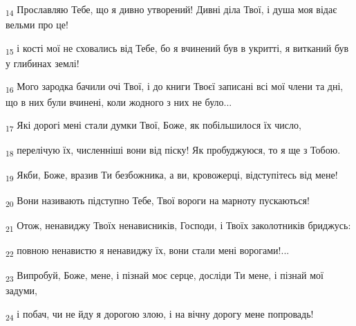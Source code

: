 \begin{tcolorbox}
\textsubscript{14} Прославляю Тебе, що я дивно утворений! Дивні діла Твої, і душа моя відає вельми про це!
\end{tcolorbox}
\begin{tcolorbox}
\textsubscript{15} і кості мої не сховались від Тебе, бо я вчинений був в укритті, я витканий був у глибинах землі!
\end{tcolorbox}
\begin{tcolorbox}
\textsubscript{16} Мого зародка бачили очі Твої, і до книги Твоєї записані всі мої члени та дні, що в них були вчинені, коли жодного з них не було...
\end{tcolorbox}
\begin{tcolorbox}
\textsubscript{17} Які дорогі мені стали думки Твої, Боже, як побільшилося їх число,
\end{tcolorbox}
\begin{tcolorbox}
\textsubscript{18} перелічую їх, численніші вони від піску! Як пробуджуюся, то я ще з Тобою.
\end{tcolorbox}
\begin{tcolorbox}
\textsubscript{19} Якби, Боже, вразив Ти безбожника, а ви, кровожерці, відступітесь від мене!
\end{tcolorbox}
\begin{tcolorbox}
\textsubscript{20} Вони називають підступно Тебе, Твої вороги на марноту пускаються!
\end{tcolorbox}
\begin{tcolorbox}
\textsubscript{21} Отож, ненавиджу Твоїх ненависників, Господи, і Твоїх заколотників бриджусь:
\end{tcolorbox}
\begin{tcolorbox}
\textsubscript{22} повною ненавистю я ненавиджу їх, вони стали мені ворогами!...
\end{tcolorbox}
\begin{tcolorbox}
\textsubscript{23} Випробуй, Боже, мене, і пізнай моє серце, досліди Ти мене, і пізнай мої задуми,
\end{tcolorbox}
\begin{tcolorbox}
\textsubscript{24} і побач, чи не йду я дорогою злою, і на вічну дорогу мене попровадь!
\end{tcolorbox}
